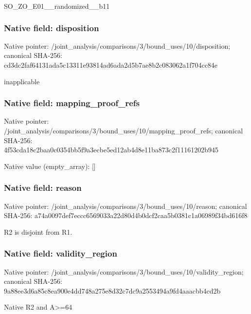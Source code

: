 \documentclass[10pt,a4paper]{article}
\begin{document}
\begingroup\raggedright\sloppy SO\_\allowbreak{}ZO\_\allowbreak{}E01\_\allowbreak{}\_\allowbreak{}randomized\_\allowbreak{}\_\allowbreak{}b11\par\endgroup

\subsubsection{Native field: disposition}
Native pointer: /joint\_\allowbreak{}analysis/comparisons/3/bound\_\allowbreak{}uses/10/disposition; canonical SHA-256: cd3dc2faf64131ada5c13311e93814ad6ada2d5b7ae8b2c083062a1f704cc84e

\begingroup\raggedright\sloppy inapplicable\par\endgroup

\subsubsection{Native field: mapping\_\allowbreak{}proof\_\allowbreak{}refs}
Native pointer: /joint\_\allowbreak{}analysis/comparisons/3/bound\_\allowbreak{}uses/10/mapping\_\allowbreak{}proof\_\allowbreak{}refs; canonical SHA-256: 4f53cda18c2baa0c0354bb5f9a3ecbe5ed12ab4d8e11ba873c2f11161202b945

Native value (empty\_\allowbreak{}array): []

\subsubsection{Native field: reason}
Native pointer: /joint\_\allowbreak{}analysis/comparisons/3/bound\_\allowbreak{}uses/10/reason; canonical SHA-256: a74a0097def7eccc6569033a22d80d4b0dcf2caa5b0381c1a06989f34bd616f8

\begingroup\raggedright\sloppy R2 is disjoint from R1.\par\endgroup

\subsubsection{Native field: validity\_\allowbreak{}region}
Native pointer: /joint\_\allowbreak{}analysis/comparisons/3/bound\_\allowbreak{}uses/10/validity\_\allowbreak{}region; canonical SHA-256: 9a88ee3d6a85c8ea900e4dd748a275e8d32c7dc9a2553494a9fd4aaacbb4cd2b

\begingroup\raggedright\sloppy Native R2 and A>=\allowbreak{}64\par\endgroup
\end{document}
